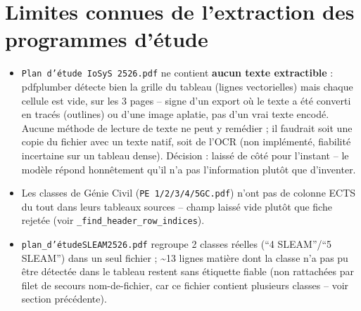 \documentclass[11pt,a4paper]{report}
\begin{document}
\section{Limites connues de l'extraction des programmes d'étude}
\begin{statutlimite}
\begin{itemize}
    \item \texttt{Plan d'étude IoSyS 2526.pdf} ne contient \textbf{aucun texte
    extractible} : pdfplumber détecte bien la grille du tableau (lignes
    vectorielles) mais chaque cellule est vide, sur les 3 pages -- signe d'un
    export où le texte a été converti en tracés (outlines) ou d'une image
    aplatie, pas d'un vrai texte encodé. Aucune méthode de lecture de texte ne
    peut y remédier ; il faudrait soit une copie du fichier avec un texte
    natif, soit de l'OCR (non implémenté, fiabilité incertaine sur un tableau
    dense). Décision : laissé de côté pour l'instant -- le modèle répond
    honnêtement qu'il n'a pas l'information plutôt que d'inventer.
    \item Les classes de Génie Civil (\texttt{PE 1/2/3/4/5GC.pdf}) n'ont pas
    de colonne ECTS du tout dans leurs tableaux sources -- champ laissé vide
    plutôt que fiche rejetée (voir \texttt{\_find\_header\_row\_indices}).
    \item \texttt{plan\_d'étudeSLEAM2526.pdf} regroupe 2 classes réelles
    (``4 SLEAM''/``5 SLEAM'') dans un seul fichier ; \textasciitilde13 lignes
    matière dont la classe n'a pas pu être détectée dans le tableau restent
    sans étiquette fiable (non rattachées par filet de secours nom-de-fichier,
    car ce fichier contient plusieurs classes -- voir section précédente).
\end{itemize}
\end{statutlimite}
\end{document}
